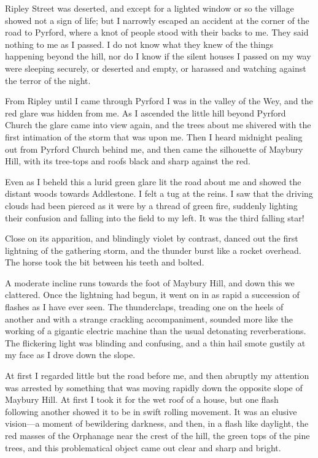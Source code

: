 Ripley Street was deserted, and except for a lighted window or so the village showed not a sign of life; but I narrowly escaped an accident at the corner of the road to Pyrford, where a knot of people stood with their backs to me. They said nothing to me as I passed. I do not know what they knew of the things happening beyond the hill, nor do I know if the silent houses I passed on my way were sleeping securely, or deserted and empty, or harassed and watching against the terror of the night.

From Ripley until I came through Pyrford I was in the valley of the Wey, and the red glare was hidden from me. As I ascended the little hill beyond Pyrford Church the glare came into view again, and the trees about me shivered with the first intimation of the storm that was upon me. Then I heard midnight pealing out from Pyrford Church behind me, and then came the silhouette of Maybury Hill, with its tree-tops and roofs black and sharp against the red.

Even as I beheld this a lurid green glare lit the road about me and showed the distant woods towards Addlestone. I felt a tug at the reins. I saw that the driving clouds had been pierced as it were by a thread of green fire, suddenly lighting their confusion and falling into the field to my left. It was the third falling star!

Close on its apparition, and blindingly violet by contrast, danced out the first lightning of the gathering storm, and the thunder burst like a rocket overhead. The horse took the bit between his teeth and bolted.

A moderate incline runs towards the foot of Maybury Hill, and down this we clattered. Once the lightning had begun, it went on in as rapid a succession of flashes as I have ever seen. The thunderclaps, treading one on the heels of another and with a strange crackling accompaniment, sounded more like the working of a gigantic electric machine than the usual detonating reverberations. The flickering light was blinding and confusing, and a thin hail smote gustily at my face as I drove down the slope.

At first I regarded little but the road before me, and then abruptly my attention was arrested by something that was moving rapidly down the opposite slope of Maybury Hill. At first I took it for the wet roof of a house, but one flash following another showed it to be in swift rolling movement. It was an elusive vision—a moment of bewildering darkness, and then, in a flash like daylight, the red masses of the Orphanage near the crest of the hill, the green tops of the pine trees, and this problematical object came out clear and sharp and bright.


